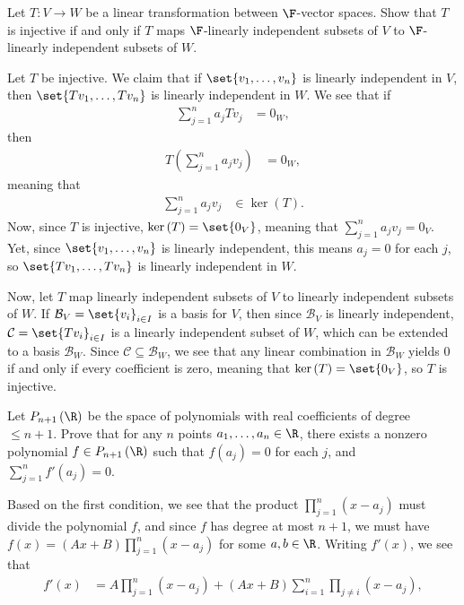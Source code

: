 \documentclass[10pt]{mypackage}
\begin{document}
\RaggedRight
\begin{problem}[Problem 1]
  Let $T\colon V\rightarrow W$ be a linear transformation between $\F$-vector spaces. Show that $T$ is injective if and only if $T$ maps $\F$-linearly independent subsets of $V$ to $\F$-linearly independent subsets of $W$.
\end{problem}
\begin{solution}
  Let $T$ be injective. We claim that if $\set{v_1,\dots,v_n}$ is linearly independent in $V$, then $\set{Tv_1,\dots,Tv_n}$ is linearly independent in $W$. We see that if
  \begin{align*}
    \sum_{j=1}^{n}a_jTv_j &= 0_{W},
  \end{align*}
  then
  \begin{align*}
    T\left( \sum_{j=1}^{n}a_jv_j \right) &= 0_W,
  \end{align*}
  meaning that
  \begin{align*}
    \sum_{j=1}^{n}a_jv_j &\in \ker\left( T \right).
  \end{align*}
  Now, since $T$ is injective, $\ker\left( T \right) = \set{0_V}$, meaning that $\sum_{j=1}^{n}a_jv_j = 0_V$. Yet, since $\set{v_1,\dots,v_n}$ is linearly independent, this means $a_j = 0$ for each $j$, so $\set{Tv_1,\dots,Tv_n}$ is linearly independent in $W$.\newline

  Now, let $T$ map linearly independent subsets of $V$ to linearly independent subsets of $W$. If $\mathcal{B}_V = \set{v_i}_{i\in I}$ is a basis for $V$, then since $\mathcal{B}_V$ is linearly independent, $\mathcal{C} = \set{Tv_i}_{i\in I}$ is a linearly independent subset of $W$, which can be extended to a basis $\mathcal{B}_W$. Since $\mathcal{C}\subseteq \mathcal{B}_W$, we see that any linear combination in $\mathcal{B}_W$ yields $0$ if and only if every coefficient is zero, meaning that $\ker\left( T \right) = \set{0_V}$, so $T$ is injective.
\end{solution}
\begin{problem}[Problem 2]
  Let $P_{n+1}\left( \R \right)$ be the space of polynomials with real coefficients of degree $\leq n+1$. Prove that for any $n$ points $a_1,\dots,a_n\in \R$, there exists a nonzero polynomial $f\in P_{n+1}\left( \R \right)$ such that $f\left( a_j \right) = 0$ for each $j$, and $\sum_{j=1}^{n}f'\left(a_j\right) = 0$.
\end{problem}
\begin{solution}
  Based on the first condition, we see that the product $\prod_{j=1}^{n}\left( x-a_j \right)$ must divide the polynomial $f$, and since $f$ has degree at most $n+1$, we must have $f(x) = \left( Ax+B \right)\prod_{j=1}^{n} \left( x-a_j \right)$ for some $a,b\in \R$. Writing $f'(x)$, we see that
  \begin{align*}
    f'(x) &= A\prod_{j=1}^{n}\left( x-a_j \right) + \left( Ax+B \right)\sum_{i=1}^{n} \prod_{j\neq i}\left( x-a_j \right),
  \end{align*}
\end{solution}
\end{document}
